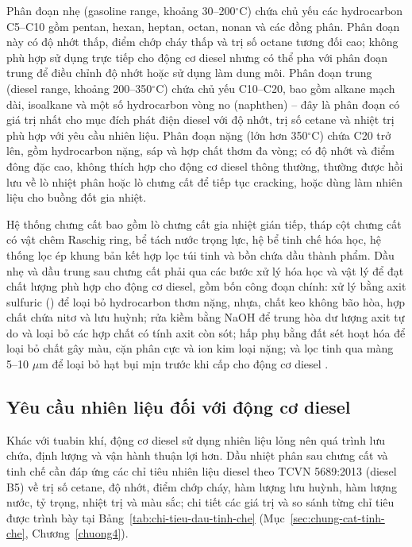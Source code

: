 \documentclass[../main.tex]{subfiles}
\begin{document}
Phân đoạn nhẹ (gasoline range, khoảng 30--200$^\circ\mathrm{C}$) chứa chủ yếu các hydrocarbon C5--C10 gồm pentan, hexan, heptan, octan, nonan và các đồng phân. Phân đoạn này có độ nhớt thấp, điểm chớp cháy thấp và trị số octane tương đối cao; không phù hợp sử dụng trực tiếp cho động cơ diesel nhưng có thể pha với phân đoạn trung để điều chỉnh độ nhớt hoặc sử dụng làm dung môi. Phân đoạn trung (diesel range, khoảng 200--350$^\circ\mathrm{C}$) chứa chủ yếu C10--C20, bao gồm alkane mạch dài, isoalkane và một số hydrocarbon vòng no (naphthen) -- đây là phân đoạn có giá trị nhất cho mục đích phát điện diesel với độ nhớt, trị số cetane và nhiệt trị phù hợp với yêu cầu nhiên liệu. Phân đoạn nặng (lớn hơn 350$^\circ\mathrm{C}$) chứa C20 trở lên, gồm hydrocarbon nặng, sáp và hợp chất thơm đa vòng; có độ nhớt và điểm đông đặc cao, không thích hợp cho động cơ diesel thông thường, thường được hồi lưu về lò nhiệt phân hoặc lò chưng cất để tiếp tục cracking, hoặc dùng làm nhiên liệu cho buồng đốt gia nhiệt.

Hệ thống chưng cất bao gồm lò chưng cất gia nhiệt gián tiếp, tháp cột chưng cất có vật chêm Raschig ring, bể tách nước trọng lực, hệ bể tinh chế hóa học, hệ thống lọc ép khung bản kết hợp lọc túi tinh và bồn chứa dầu thành phẩm. Dầu nhẹ và dầu trung sau chưng cất phải qua các bước xử lý hóa học và vật lý để đạt chất lượng phù hợp cho động cơ diesel, gồm bốn công đoạn chính: xử lý bằng axit sulfuric () để loại bỏ hydrocarbon thơm nặng, nhựa, chất keo không bão hòa, hợp chất chứa nitơ và lưu huỳnh; rửa kiềm bằng NaOH để trung hòa dư lượng axit tự do và loại bỏ các hợp chất có tính axit còn sót; hấp phụ bằng đất sét hoạt hóa để loại bỏ chất gây màu, cặn phân cực và ion kim loại nặng; và lọc tinh qua màng 5--10 $\mu$m để loại bỏ hạt bụi mịn trước khi cấp cho động cơ diesel \cite{Williams2007,mohammad2021refining,kalargaris2018upgrading}.

\subsection{Yêu cầu nhiên liệu đối với động cơ diesel}
\label{sec:yeu-cau-dong-co-diesel}

Khác với tuabin khí, động cơ diesel sử dụng nhiên liệu lỏng nên quá trình lưu chứa, định lượng và vận hành thuận lợi hơn. Dầu nhiệt phân sau chưng cất và tinh chế cần đáp ứng các chỉ tiêu nhiên liệu diesel theo TCVN 5689:2013 (diesel B5) về trị số cetane, độ nhớt, điểm chớp cháy, hàm lượng lưu huỳnh, hàm lượng nước, tỷ trọng, nhiệt trị và màu sắc; chi tiết các giá trị và so sánh từng chỉ tiêu được trình bày tại Bảng~\ref{tab:chi-tieu-dau-tinh-che} (Mục~\ref{sec:chung-cat-tinh-che}, Chương~\ref{chuong4}).
\end{document}
